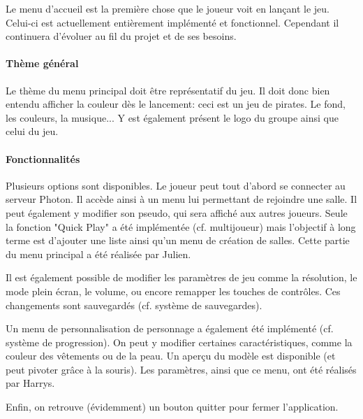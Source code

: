 \documentclass[../doc.tex]{subfiles}
\begin{document}
    Le menu d'accueil est la première chose que le joueur voit en lançant le jeu.
    Celui-ci est actuellement entièrement implémenté et fonctionnel. Cependant il continuera 
    d'évoluer au fil du projet et de ses besoins.

    \paragraph{Thème général}
    Le thème du menu principal doit être représentatif du jeu. Il doit donc bien entendu 
    afficher la couleur dès le lancement: ceci est un jeu de pirates.
    Le fond, les couleurs, la musique... Y est également présent le logo du 
    groupe ainsi que celui du jeu.
    
    \paragraph{Fonctionnalités}
    Plusieurs options sont disponibles. Le joueur peut tout d'abord se connecter 
    au serveur Photon. Il accède ainsi à un menu lui permettant de rejoindre une 
    salle. Il peut également y modifier son pseudo, qui sera affiché aux autres 
    joueurs. Seule la fonction "Quick Play" a été implémentée (cf. multijoueur) mais 
    l'objectif à long terme est d'ajouter une liste ainsi qu'un menu de création de 
    salles. Cette partie du menu principal a été réalisée par Julien.
    
    Il est également possible de modifier les paramètres de jeu comme la 
    résolution, le mode plein écran, le volume, ou encore remapper les touches de 
    contrôles. Ces changements sont sauvegardés (cf. système de sauvegardes).
    
    Un menu de personnalisation de personnage a également été implémenté 
    (cf. système de progression). On peut y modifier certaines caractéristiques, 
    comme la couleur des vêtements ou de la peau. Un aperçu du modèle est disponible 
    (et peut pivoter grâce à la souris). Les paramètres, ainsi que ce menu, ont été 
    réalisés par Harrys.
    
    Enfin, on retrouve (évidemment) un bouton quitter pour fermer l'application.
    
\end{document}
